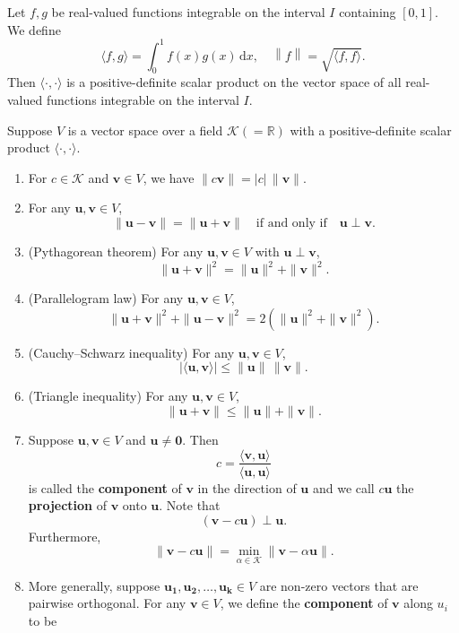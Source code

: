 	\begin{exampleenv}
		Let $f,g$ be real-valued functions integrable on the interval $I$ containing $[0,1]$. We define
		\[
		\langle f, g \rangle = \int_0 ^1 f(x) g(x) \,\mathrm{d}x, \quad \left\| f \right\| = \sqrt{\langle f, f \rangle}.
		\]
		Then $\langle \cdot, \cdot \rangle$ is a positive-definite scalar product on the vector space of all real-valued functions integrable on the interval $I$.
	\end{exampleenv}
	\begin{propositionenv}
		Suppose $V$ is a vector space over a field $\mathcal{K}\left( = \mathbb{R} \right)$ with a positive-definite scalar product $\langle \cdot, \cdot \rangle$.
		\begin{enumerate}
			\item For $c\in \mathcal{K}$ and $\bm{v} \in V$, we have $\| c \bm{v} \| = |c| \, \| \bm{v} \|$.
			\item For any $\bm{u}, \bm{v} \in V$,
			\[
			\| \bm{u}-\bm{v} \| = \| \bm{u}+\bm{v} \| \quad \text{if and only if} \quad \bm{u} \perp \bm{v}.
			\]
			\item (Pythagorean theorem) For any $\bm{u}, \bm{v} \in V$ with $\bm{u} \perp \bm{v}$,
			\[
			\| \bm{u} + \bm{v} \|^2 = \| \bm{u} \|^2 + \| \bm{v} \|^2.
			\]
			\item (Parallelogram law) For any $\bm{u}, \bm{v} \in V$,
			\[
			\| \bm{u} + \bm{v} \|^2 + \| \bm{u} - \bm{v} \|^2 = 2 \left( \| \bm{u} \|^2 + \| \bm{v} \|^2 \right).
			\]
			\item (Cauchy–Schwarz inequality) For any $\bm{u}, \bm{v} \in V$,
			\[
			|\langle \bm{u}, \bm{v} \rangle| \leq \| \bm{u} \| \, \| \bm{v} \|.
			\]
			\item (Triangle inequality) For any $\bm{u}, \bm{v} \in V$,
			\[
			\| \bm{u} + \bm{v} \| \leq \| \bm{u} \| + \| \bm{v} \|.
			\]
			\item Suppose $\bm{u}, \bm{v} \in V$ and $\bm{u} \neq \bm{0}$. Then
			\[
			c = \frac{\langle \bm{v}, \bm{u} \rangle}{\langle \bm{u}, \bm{u} \rangle}
			\]
			is called the \textbf{component} of $\bm{v}$ in the direction of $\bm{u}$ and we call $c \bm{u}$ the \textbf{projection} of $\bm{v}$ onto $\bm{u}$. Note that 
			\[
			\left( \bm{v} - c \bm{u} \right) \perp \bm{u}.
			\]
			Furthermore,
			\[
			\| \bm{v} - c \bm{u} \| = \min_{\alpha \in \mathcal{K}} \| \bm{v} - \alpha \bm{u} \|.
			\]
			\item More generally, suppose $\bm{u_1}, \bm{u_2}, \dots, \bm{u_k} \in V$ are non-zero vectors that are pairwise orthogonal. For any $\bm{v} \in V$, we define the \textbf{component} of $\bm{v}$ along $u_i$ to be 

\end{enumerate}
\end{propositionenv}
